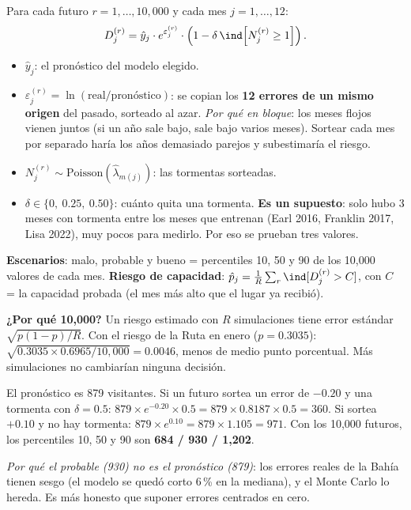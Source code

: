 Para cada futuro $r=1,\dots,10{,}000$ y cada mes $j=1,\dots,12$:
\[
D^{(r)}_j=\hat y_j\cdot e^{\varepsilon^{(r)}_j}\cdot\left(1-\delta\,\ind\!\left[N^{(r)}_j\ge1\right]\right).
\]
\begin{itemize}
\item $\hat y_j$: el pronóstico del modelo elegido.
\item $\varepsilon^{(r)}_j=\ln(\text{real}/\text{pronóstico})$: se copian los \textbf{12 errores de un mismo origen} del
  pasado, sorteado al azar. \emph{Por qué en bloque}: los meses flojos vienen juntos (si un año sale bajo, sale bajo varios
  meses). Sortear cada mes por separado haría los años demasiado parejos y subestimaría el riesgo.
\item $N^{(r)}_j\sim\text{Poisson}(\hat\lambda_{m(j)})$: las tormentas sorteadas.
\item $\delta\in\{0,\ 0.25,\ 0.50\}$: cuánto quita una tormenta. \textbf{Es un supuesto}: solo hubo 3 meses con tormenta
  entre los meses que entrenan (Earl 2016, Franklin 2017, Lisa 2022), muy pocos para medirlo. Por eso se prueban tres
  valores.
\end{itemize}

\textbf{Escenarios}: malo, probable y bueno = percentiles 10, 50 y 90 de los 10,000 valores de cada mes. \textbf{Riesgo de
capacidad}: $\hat p_j=\frac1R\sum_r\ind[D^{(r)}_j>C]$, con $C$ = la capacidad probada (el mes más alto que el lugar ya
recibió).

\textbf{¿Por qué 10,000?} Un riesgo estimado con $R$ simulaciones tiene error estándar $\sqrt{p(1-p)/R}$. Con el riesgo de
la Ruta en enero ($p=0.3035$): $\sqrt{0.3035\times0.6965/10{,}000}=0.0046$, menos de medio punto porcentual. Más
simulaciones no cambiarían ninguna decisión.

\begin{amano}
El pronóstico es 879 visitantes. Si un futuro sortea un error de $-0.20$ y una tormenta con $\delta=0.5$:
$879\times e^{-0.20}\times0.5=879\times0.8187\times0.5=360$. Si sortea $+0.10$ y no hay tormenta:
$879\times e^{0.10}=879\times1.105=971$. Con los 10,000 futuros, los percentiles 10, 50 y 90 son \textbf{684 / 930 /
1,202}.

\emph{Por qué el probable (930) no es el pronóstico (879)}: los errores reales de la Bahía tienen sesgo (el modelo se quedó
corto 6\,\% en la mediana), y el Monte Carlo lo hereda. Es más honesto que suponer errores centrados en cero.
\end{amano}


